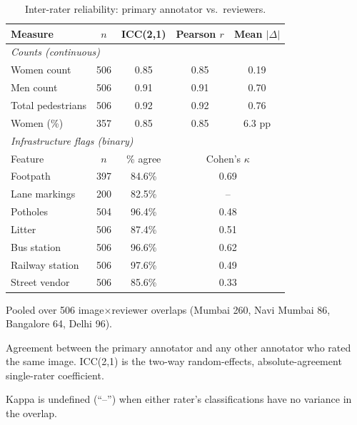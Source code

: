 \begin{table}[t]
\centering
\caption{Inter-rater reliability: primary annotator vs.\ reviewers.}
\label{tab:irr}
\scriptsize
\begin{threeparttable}
\begin{tabular}{lcccc}
\toprule
Measure & $n$ & ICC(2,1) & Pearson $r$ & Mean $|\Delta|$ \\
\midrule
\multicolumn{5}{l}{\textit{Counts (continuous)}} \\
Women count & 506 & 0.85 & 0.85 & 0.19 \\
Men count & 506 & 0.91 & 0.91 & 0.70 \\
Total pedestrians & 506 & 0.92 & 0.92 & 0.76 \\
Women (\%) & 357 & 0.85 & 0.85 & 6.3 pp \\
\midrule
\multicolumn{5}{l}{\textit{Infrastructure flags (binary)}} \\
Feature & $n$ & \% agree & \multicolumn{2}{c}{Cohen's $\kappa$} \\
Footpath & 397 & 84.6\% & \multicolumn{2}{c}{0.69} \\
Lane markings & 200 & 82.5\% & \multicolumn{2}{c}{--} \\
Potholes & 504 & 96.4\% & \multicolumn{2}{c}{0.48} \\
Litter & 506 & 87.4\% & \multicolumn{2}{c}{0.51} \\
Bus station & 506 & 96.6\% & \multicolumn{2}{c}{0.62} \\
Railway station & 506 & 97.6\% & \multicolumn{2}{c}{0.49} \\
Street vendor & 506 & 85.6\% & \multicolumn{2}{c}{0.33} \\
\bottomrule
\end{tabular}
\begin{tablenotes}[flushleft]
\item Pooled over 506 image$\times$reviewer overlaps (Mumbai 260, Navi Mumbai 86, Bangalore 64, Delhi 96).
\item Agreement between the primary annotator and any other annotator who rated the same image. ICC(2,1) is the two-way random-effects, absolute-agreement single-rater coefficient.
\item Kappa is undefined (``--'') when either rater's classifications have no variance in the overlap.
\end{tablenotes}
\end{threeparttable}
\end{table}
